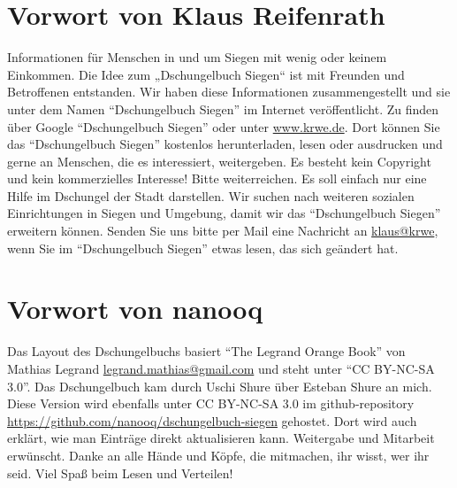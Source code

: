 
\pagestyle{empty} %

\tableofcontents %

\cleardoublepage %

\pagestyle{fancy} %


\section{Vorwort von Klaus Reifenrath}

Informationen für Menschen in und um Siegen mit  wenig oder keinem Einkommen. Die Idee zum „Dschungelbuch Siegen“ ist mit Freunden und Betroffenen entstanden. Wir haben diese Informationen zusammengestellt und sie unter dem Namen \enquote{Dschungelbuch Siegen} im Internet veröffentlicht. Zu finden über Google \enquote{Dschungelbuch Siegen} oder unter \href{http://www.krwe.de}{ www.krwe.de}. Dort können Sie das \enquote{Dschungelbuch Siegen} kostenlos herunterladen, lesen oder ausdrucken und gerne an Menschen, die es interessiert, weitergeben. Es besteht kein Copyright und kein kommerzielles Interesse! Bitte weiterreichen. Es soll einfach nur eine Hilfe im Dschungel der Stadt darstellen. Wir suchen nach weiteren sozialen Einrichtungen in Siegen und Umgebung, damit wir das \enquote{Dschungelbuch Siegen} erweitern können. Senden Sie uns bitte per Mail eine Nachricht an \href{mailto:klaus@krwe.de}{klaus@krwe}, wenn Sie im \enquote{Dschungelbuch Siegen} etwas lesen, das sich geändert hat.

\section{Vorwort von nanooq}

Das Layout des Dschungelbuchs basiert \enquote{The Legrand Orange Book} von Mathias Legrand \href{mailto:legrand.mathias@gmail.com}{legrand.mathias@gmail.com} und steht unter \enquote{CC BY-NC-SA 3.0}. Das Dschungelbuch kam durch Uschi Shure über Esteban Shure an mich. Diese Version wird ebenfalls unter CC BY-NC-SA 3.0 im github-repository \href{https://github.com/nanooq/dschungelbuch-siegen}{https://github.com/nanooq/dschungelbuch-siegen} gehostet. Dort wird auch erklärt, wie man Einträge direkt aktualisieren kann. Weitergabe und Mitarbeit erwünscht. Danke an alle Hände und Köpfe, die mitmachen, ihr wisst, wer ihr seid. Viel Spaß beim Lesen und Verteilen!